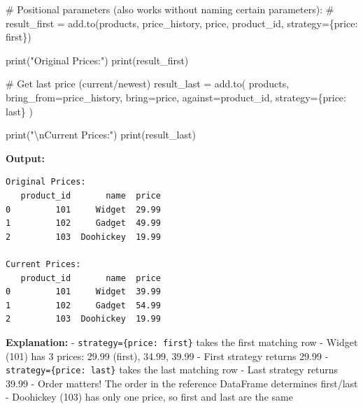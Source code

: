 \documentclass[
  letterpaper,
]{scrbook}
\newenvironment{Shaded}{\begin{snugshade}}{\end{snugshade}}
\newcommand{\BuiltInTok}[1]{\textcolor[rgb]{0.00,0.23,0.31}{#1}}
\newcommand{\CharTok}[1]{\textcolor[rgb]{0.13,0.47,0.30}{#1}}
\newcommand{\CommentTok}[1]{\textcolor[rgb]{0.37,0.37,0.37}{#1}}
\newcommand{\NormalTok}[1]{\textcolor[rgb]{0.00,0.23,0.31}{#1}}
\newcommand{\OperatorTok}[1]{\textcolor[rgb]{0.37,0.37,0.37}{#1}}
\newcommand{\StringTok}[1]{\textcolor[rgb]{0.13,0.47,0.30}{#1}}
\begin{document}
\begin{Shaded}
\begin{Highlighting}[]
\CommentTok{\# Positional parameters (also works without naming certain parameters):}
\CommentTok{\# result\_first = add.to(products, price\_history, \textquotesingle{}price\textquotesingle{}, \textquotesingle{}product\_id\textquotesingle{}, strategy=\{\textquotesingle{}price\textquotesingle{}: \textquotesingle{}first\textquotesingle{}\})}

\BuiltInTok{print}\NormalTok{(}\StringTok{"Original Prices:"}\NormalTok{)}
\BuiltInTok{print}\NormalTok{(result\_first)}

\CommentTok{\# Get last price (current/newest)}
\NormalTok{result\_last }\OperatorTok{=}\NormalTok{ add.to(}
\NormalTok{    products,}
\NormalTok{    bring\_from}\OperatorTok{=}\NormalTok{price\_history,}
\NormalTok{    bring}\OperatorTok{=}\StringTok{\textquotesingle{}price\textquotesingle{}}\NormalTok{,}
\NormalTok{    against}\OperatorTok{=}\StringTok{\textquotesingle{}product\_id\textquotesingle{}}\NormalTok{,}
\NormalTok{    strategy}\OperatorTok{=}\NormalTok{\{}\StringTok{\textquotesingle{}price\textquotesingle{}}\NormalTok{: }\StringTok{\textquotesingle{}last\textquotesingle{}}\NormalTok{\}}
\NormalTok{)}

\BuiltInTok{print}\NormalTok{(}\StringTok{"}\CharTok{\textbackslash{}n}\StringTok{Current Prices:"}\NormalTok{)}
\BuiltInTok{print}\NormalTok{(result\_last)}
\end{Highlighting}
\end{Shaded}

\textbf{Output:}

\begin{verbatim}
Original Prices:
   product_id       name  price
0         101     Widget  29.99
1         102     Gadget  49.99
2         103  Doohickey  19.99

Current Prices:
   product_id       name  price
0         101     Widget  39.99
1         102     Gadget  54.99
2         103  Doohickey  19.99
\end{verbatim}

\textbf{Explanation:} -
\texttt{strategy=\{\textquotesingle{}price\textquotesingle{}:\ \textquotesingle{}first\textquotesingle{}\}}
takes the first matching row - Widget (101) has 3 prices: 29.99 (first),
34.99, 39.99 - First strategy returns 29.99 -
\texttt{strategy=\{\textquotesingle{}price\textquotesingle{}:\ \textquotesingle{}last\textquotesingle{}\}}
takes the last matching row - Last strategy returns 39.99 - Order
matters! The order in the reference DataFrame determines first/last -
Doohickey (103) has only one price, so first and last are the same
\end{document}
